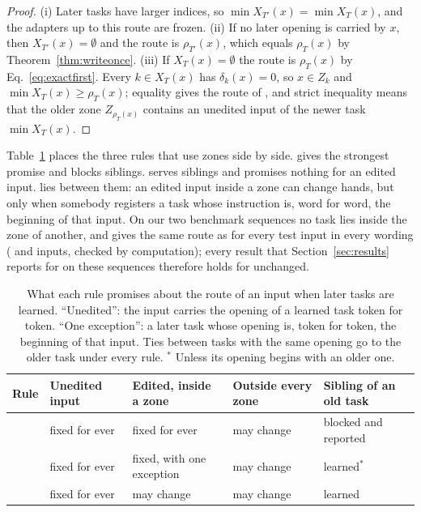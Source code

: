 \begin{proof}
(i) Later tasks have larger indices, so $\min X_{T'}(x) = \min X_T(x)$, and the adapters up to this
route are frozen. (ii) If no later opening is carried by $x$, then $X_{T'}(x) = \emptyset$ and the
route is $\rho_{T'}(x)$, which equals $\rho_T(x)$ by Theorem~\ref{thm:writeonce}. (iii) If $X_T(x)=\emptyset$ the route is $\rho_T(x)$ by Eq.~\eqref{eq:exactfirst}. Every $k\in X_T(x)$ has $\delta_k(x)=0$, so $x\in Z_k$ and $\min X_T(x)\ge\rho_T(x)$; equality gives the route of \cert{}, and strict inequality means that the older zone $Z_{\rho_T(x)}$ contains an unedited input of the newer task $\min X_T(x)$.
\end{proof}

Table~\ref{tab:guarantees} places the three rules that use zones side by side. \cert{} gives the
strongest promise and blocks siblings. \nearest{} serves siblings and promises nothing for an
edited input. \exactfirst{} lies between them: an edited input inside a zone can change hands, but
only when somebody registers a task whose instruction is, word for word, the beginning of that
input.
On our two benchmark sequences no task lies inside the zone of another, and \exactfirst{} gives
the same route as \cert{} for every test input in every wording (\ExactSameFive{} and
\ExactSameFifteen{} inputs, checked by computation); every result that Section~\ref{sec:results}
reports for \cert{} on these sequences therefore holds for \exactfirst{} unchanged.

\begin{table}[t]
  \caption{What each rule promises about the route of an input when later tasks are learned.
  ``Unedited'': the input carries the opening of a learned task token for token. ``One exception'':
  a later task whose opening is, token for token, the beginning of that input. Ties between tasks
  with the same opening go to the older task under every rule. $^*$ Unless its opening begins with an older one.}
  \label{tab:guarantees}
  \centering
  \footnotesize
  \setlength{\tabcolsep}{4pt}
  \begin{tabular}{lllll}
    \toprule
    Rule & Unedited input & Edited, inside a zone & Outside every zone & Sibling of an old task \\
    \midrule
    \cert{} & fixed for ever & fixed for ever & may change & blocked and reported \\
    \exactfirst{} & fixed for ever & fixed, with one exception & may change & learned$^*$ \\
    \nearest{} & fixed for ever & may change & may change & learned \\
    \bottomrule
  \end{tabular}
\end{table}

